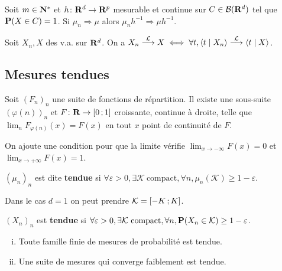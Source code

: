 	\begin{thm}
		Soit $m \in \mathbf{N}^*$ et $h \colon \mathbf{R}^d \to \mathbf{R}^p$ mesurable et continue sur $C \in \mathcal{B}(\mathbf{R}^d)$ tel que $\mathbf{P}(X \in C) = 1$.
		Si $\mu_n \Rightarrow \mu$ alors $\mu_n h^{-1} \Rightarrow \mu h^{-1}$.
	\end{thm}
	
	\begin{thm}
		Soit $X_n, X$ des v.a. sur $\mathbf{R}^d$.
		On a $X_n \overset{\mathcal{L}}{\longrightarrow} X \iff \forall t, \left\langle t \mid X_n \right\rangle \overset{\mathcal{L}}{\longrightarrow} \left\langle t \mid X \right\rangle$.
	\end{thm}


\subsection{Mesures tendues}

	\begin{lem}[d'Helly]
		Soit $(F_n)_n$ une suite de fonctions de répartition.
		Il existe une sous-suite $(\varphi(n))_n$ et $F \colon \mathbf{R} \to \mathopen{}\mathclose{\left[0\mathclose{}\mathpunct{};1\right]}$ croissante, continue à droite, telle que $\lim_n F_{\varphi(n)}(x) = F(x)$ en tout $x$ point de continuité de $F$.
	\end{lem}
	
	On ajoute une condition pour que la limite vérifie $\lim_{x \to -\infty} F(x) = 0$ et $\lim_{x \to +\infty} F(x) = 1$.

	\begin{defn}
		$(\mu_n)_n$ est dite \textbf{tendue} si $\forall \varepsilon > 0, \exists \mathcal{K} \ \text{compact}, \forall n, \mu_n(\mathcal{K}) \geq 1 - \varepsilon$.
	\end{defn}

	Dans le cas $d = 1$ on peut prendre $\mathcal{K} = \mathopen{}\mathclose{\left[-K\mathclose{}\mathpunct{};K\right]}$.
	
	\begin{defn}
		$(X_n)_n$ est \textbf{tendue} si $\forall \varepsilon > 0, \exists \mathcal{K} \ \text{compact}, \forall n, \mathbf{P}(X_n \in \mathcal{K}) \geq 1 - \varepsilon$.
	\end{defn}
	
	\begin{pop}
		\begin{enumerate}[(i)]
			\item Toute famille finie de mesures de probabilité est tendue.
			\item Une suite de mesures qui converge faiblement est tendue.
		\end{enumerate}
	\end{pop}

